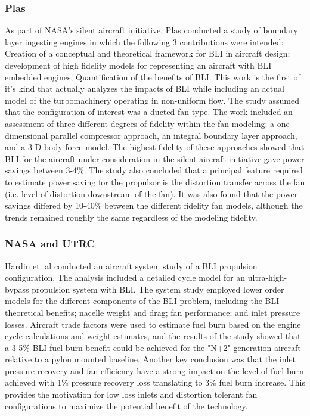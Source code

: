 \documentclass[12pt]{gatech-thesis}
\begin{document}
\subsubsection{Plas}
\indent As part of NASA's silent aircraft initiative, Plas conducted a study of boundary layer ingesting engines in which the following 3 contributions were intended:  Creation of a conceptual and theoretical framework for BLI in aircraft design; development of high fidelity models for representing an aircraft with BLI embedded engines; Quantification of the benefits of BLI.  This work is the first of it's kind that actually analyzes the impacts of BLI while including an actual model of the turbomachinery operating in non-uniform flow.  The study assumed that the configuration of interest was a ducted fan type.  The work included an assessment of three different degrees of fidelity within the fan modeling:  a one-dimensional parallel compressor approach, an integral boundary layer approach, and a 3-D body force model.  The highest fidelity of these approaches showed that BLI for the aircraft under consideration in the silent aircraft initiative gave power savings between 3-4\%.  The study also concluded that a principal feature required to estimate power saving for the propulsor is the distortion transfer across the fan (i.e. level of distortion downstream of the fan).  It was also found that the power savings differed by 10-40\% between the different fidelity fan models, although the trends remained roughly the same regardless of the modeling fidelity.

\subsubsection{NASA and UTRC}
\indent Hardin et. al conducted an aircraft system study of a BLI propulsion configuration.  The analysis included a detailed cycle model for an ultra-high-bypass propulsion system with BLI.  The system study employed lower order models for the different components of the BLI problem, including the BLI theoretical benefits; nacelle weight and drag; fan performance; and inlet pressure losses.  Aircraft trade factors were used to estimate fuel burn based on the engine cycle calculations and weight estimates, and the results of the study showed that a 3-5\% BLI fuel burn benefit could be achieved for the "N+2" generation aircraft relative to a pylon mounted baseline.  Another key conclusion was that the inlet pressure recovery and fan efficiency have a strong impact on the level of fuel burn achieved with 1\% pressure recovery loss translating to 3\% fuel burn increase.  This provides the motivation for low loss inlets and distortion tolerant fan configurations to maximize the potential benefit of the technology.
\end{document}
